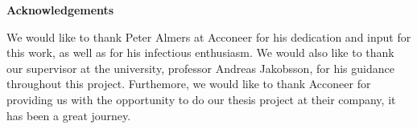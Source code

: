 \newenvironment{acknowledgements}%
    {\cleardoublepage\thispagestyle{empty}\null\vfill\begin{center}%
    \bfseries{\textsf{Acknowledgements}}\end{center}}
    {\vfill\null}
        \begin{acknowledgements}
        
	We would like to thank Peter Almers at Acconeer for his dedication and input for this work, as well as for his infectious enthusiasm. We would also like to thank our supervisor at the university, professor Andreas Jakobsson, for his guidance throughout this project. Furthemore, we would like to thank Acconeer for providing us with the opportunity to do our thesis project at their company, it has been a great journey. 
        \end{acknowledgements}
